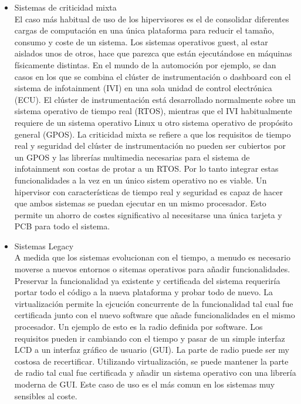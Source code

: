 \begin{itemize}
	\item Sistemas de criticidad mixta\\
	El caso más habitual de uso de los hipervisores es el de consolidar diferentes cargas de computación en una única
	plataforma para reducir el tamaño, consumo y coste de un sistema. Los sistemas operativos guest, al estar aislados unos de otros, hace que parezca que están ejecutándose en máquinas físicamente distintas. En el mundo de la automoción por ejemplo,
	se dan casos en los que se combina el clúster de instrumentación o dashboard con el sistema de infotainment (IVI) en una sola unidad de control electrónica (ECU). El clúster de instrumentación está desarrollado normalmente sobre un sistema operativo de tiempo real (RTOS), mientras que el IVI habitualmente requiere de un sistema operativo Linux u otro sistema operativo de propósito general (GPOS). La criticidad mixta se refiere a que los requisitos de tiempo real y seguridad del clúster de instrumentación no pueden ser cubiertos por un GPOS y las librerías multimedia necesarias para el sistema de infotainment son costas de protar a un RTOS. Por lo tanto integrar estas funcionalidades a la vez en un único sistem operativo no es viable. Un hipervisor con características de tiempo real y seguridad es capaz de hacer que ambos sistemas se puedan ejecutar en un mismo procesador. Esto permite un ahorro de costes significativo al necesitarse una única tarjeta y PCB para todo el sistema.
	\item Sistemas Legacy\\
	A medida que los sistemas evolucionan con el tiempo, a menudo es necesario moverse a nuevos entornos o sitemas operativos para añadir funcionalidades. Preservar la funcionalidad ya existente y certificada del sistema requeriría portar todo el código a la nueva plataforma y probar todo de nuevo. La virtualización permite la ejcución concurrente de la funcionalidad tal cual fue certificada junto con el nuevo software que añade funcionalidades en el mismo procesador. Un ejemplo de esto es la radio definida por software. Los requisitos pueden ir cambiando con el tiempo y pasar de un simple interfaz LCD a un interfaz gráfico de usuario (GUI). La parte de radio puede ser my costosa de recertificar. Utilizando virtualización, se puede mantener la parte de radio tal cual fue certificada y añadir un sistema operativo con una librería moderna de GUI.
	Este caso de uso es el más comun en los sistemas muy sensibles al coste.\\[1cm]
\end{itemize}
